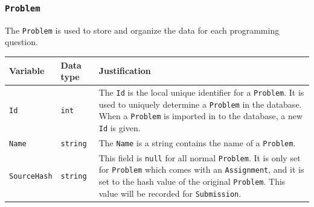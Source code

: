 \documentclass[a4paper]{report}
\begin{document}
\subsubsection{\texttt{Problem}}

The \texttt{Problem} is used to store and organize the data for each programming question.

\begin{tabulary}{\textwidth}{|l|l|L|}
    \hline
    Variable & Data type & Justification \\
    \hline
    \texttt{Id} & \texttt{int} & The \texttt{Id} is the local unique identifier for a \texttt{Problem}. It is used to uniquely determine a \texttt{Problem} in the database. When a \texttt{Problem} is imported in to the database, a new \texttt{Id} is given. \\
    \hline
    \texttt{Name} & \texttt{string} & The \texttt{Name} is a string contains the name of a \texttt{Problem}. \\
    \hline
    \texttt{SourceHash} & \texttt{string} & This field is \texttt{null} for all normal \texttt{Problem}. It is only set for \texttt{Problem} which comes with an \texttt{Assignment}, and it is set to the hash value of the original \texttt{Problem}. This value will be recorded for \texttt{Submission}. \\
    \hline
\end{tabulary}
\end{document}
